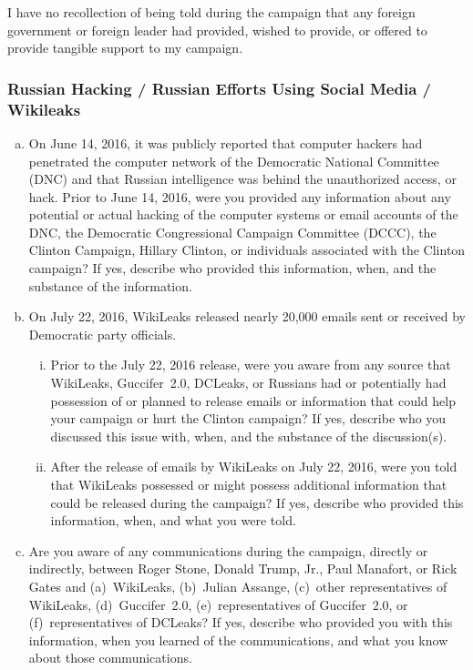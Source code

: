 I have no recollection of being told during the campaign that any foreign government or foreign leader had provided, wished to provide, or offered to provide tangible support to my campaign.

\subsubsection{Russian Hacking / Russian Efforts Using Social Media / Wikileaks}

\begin{enumerate}[a.]

\item On June 14, 2016, it was publicly reported that computer hackers had penetrated the computer network of the Democratic National Committee (DNC) and that Russian intelligence was behind the unauthorized access, or hack.
Prior to June 14, 2016, were you provided any information about any potential or actual hacking of the computer systems or email accounts of the DNC, the Democratic Congressional Campaign Committee (DCCC), the Clinton Campaign, Hillary Clinton, or individuals associated with the Clinton campaign?
If yes, describe who provided this information, when, and the substance of the information.

\item On July 22, 2016, WikiLeaks released nearly 20,000 emails sent or received by Democratic party officials.

\begin{enumerate}[i.]

\item Prior to the July 22, 2016 release, were you aware from any source that WikiLeaks, Guccifer~2.0, DCLeaks, or Russians had or potentially had possession of or planned to release emails or information that could help your campaign or hurt the Clinton campaign?
If yes, describe who you discussed this issue with, when, and the substance of the discussion(s).

\item After the release of emails by WikiLeaks on July 22, 2016, were you told that WikiLeaks possessed or might possess additional information that could be released during the campaign?
If yes, describe who provided this information, when, and what you were told.

\end{enumerate}

\item Are you aware of any communications during the campaign, directly or indirectly, between Roger Stone, Donald Trump, Jr., Paul Manafort, or Rick Gates and (a)~WikiLeaks, (b)~Julian Assange, (c)~other representatives of WikiLeaks, (d)~Guccifer~2.0, (e)~representatives of Guccifer~2.0, or (f)~representatives of DCLeaks?
If yes, describe who provided you with this information, when you learned of the communications, and what you know about those communications.


\end{enumerate}
